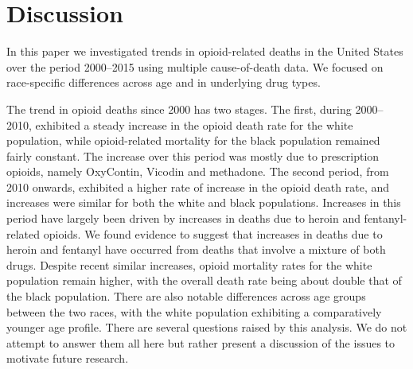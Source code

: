 \documentclass[12pt, a4paper]{article}
\begin{document}
\section{Discussion}
In this paper we investigated trends in opioid-related deaths in the United States over the period 2000--2015 using multiple cause-of-death data. We focused on race-specific differences across age and in underlying drug types. 

The trend in opioid deaths since 2000 has two stages. The first, during 2000--2010, exhibited a steady increase in the opioid death rate for the white population, while opioid-related mortality for the black population remained fairly constant. The increase over this period was mostly due to prescription opioids, namely OxyContin, Vicodin and methadone. The second period, from 2010 onwards, exhibited a higher rate of increase in the opioid death rate, and increases were similar for both the white and black populations. Increases in this period have largely been driven by increases in deaths due to heroin and fentanyl-related opioids. We found evidence to suggest that increases in deaths due to heroin and fentanyl have occurred from deaths that involve a mixture of both drugs. Despite recent similar increases, opioid mortality rates for the white population remain higher, with the overall death rate being about double that of the black population. There are also notable differences across age groups between the two races, with the white population exhibiting a comparatively younger age profile. There are several questions raised by this analysis. We do not attempt to answer them all here but rather present a discussion of the issues to motivate future research. 
\end{document}
